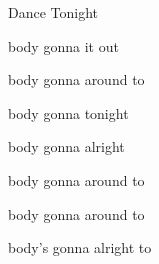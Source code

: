 \begin{SBSong}{Dance Tonight}
\begin{SBVerse}
    body gonna  it out
  
    body gonna  around to
  \end{SBVerse}
  \CBPageBrk
  \begin{SBVerse}
    body gonna  tonight

    body gonna  alright

    body gonna  around to

    body gonna  around to

    body's gonna  alright to
  \end{SBVerse}
\end{SBSong}

